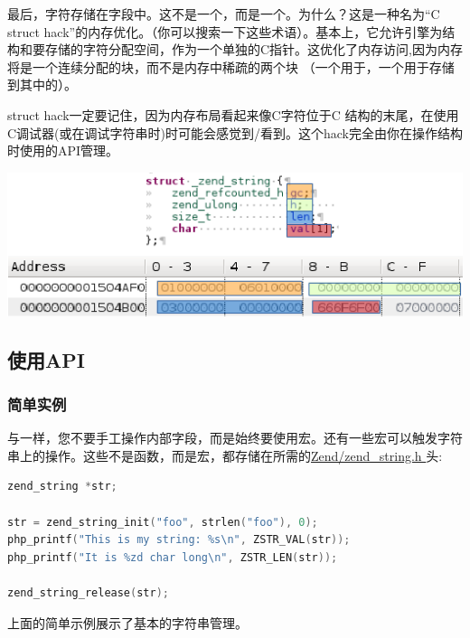 最后，字符存储在字段中。这不是一个，而是一个。为什么？这是一种名为“C struct hack”的内存优化。（你可以搜索一下这些术语）。基本上，它允许引擎为结构和要存储的字符分配空间，作为一个单独的C指针。这优化了内存访问,因为内存将是一个连续分配的块，而不是内存中稀疏的两个块
（一个用于，一个用于存储到其中的）。

struct hack一定要记住，因为内存布局看起来像C字符位于C 结构的末尾，在使用C调试器(或在调试字符串时)时可能会感觉到/看到。这个hack完全由你在操作结构时使用的API管理。

\includegraphics{images/zend_string_memory_layout.png} 

\subsection{使用API}

\subsubsection{简单实例}

与一样，您不要手工操作内部字段，而是始终要使用宏。还有一些宏可以触发字符串上的操作。这些不是函数，而是宏，都存储在所需的\href{https://github.com/php/php-src/blob/PHP-7.0/Zend/zend_string.h}{Zend/zend\_string.h }头:

\begin{lstlisting}[language=c]
zend_string *str;

str = zend_string_init("foo", strlen("foo"), 0);
php_printf("This is my string: %s\n", ZSTR_VAL(str));
php_printf("It is %zd char long\n", ZSTR_LEN(str));

zend_string_release(str);
\end{lstlisting}

上面的简单示例展示了基本的字符串管理。


